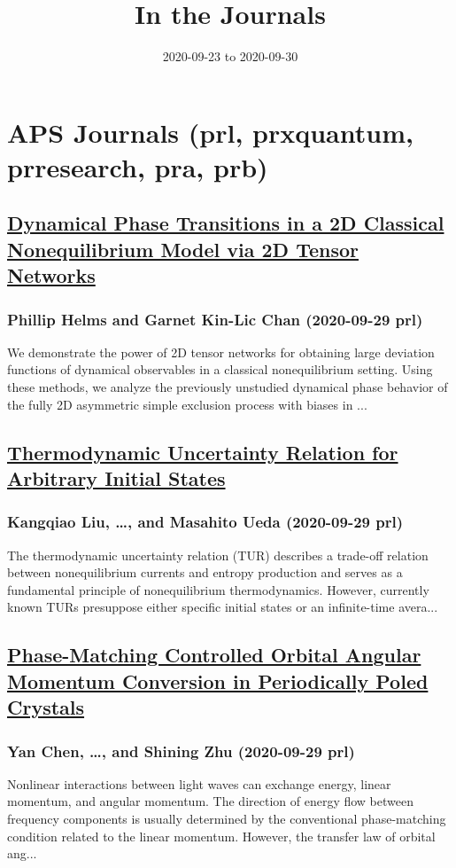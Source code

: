 \title{In the Journals}
\date{2020-09-23 to 2020-09-30}
\maketitle

\section{APS Journals (prl, prxquantum, prresearch, pra, prb)}
\subsection*{\href{http://link.aps.org/doi/10.1103/PhysRevLett.125.140601}{Dynamical Phase Transitions in a 2D Classical Nonequilibrium Model via 2D Tensor Networks}}
\subsubsection*{Phillip Helms and Garnet Kin-Lic Chan (2020-09-29 prl)}
We demonstrate the power of 2D tensor networks for obtaining large deviation functions of dynamical observables in a classical nonequilibrium setting. Using these methods, we analyze the previously unstudied dynamical phase behavior of the fully 2D asymmetric simple exclusion process with biases in ...
\subsection*{\href{http://link.aps.org/doi/10.1103/PhysRevLett.125.140602}{Thermodynamic Uncertainty Relation for Arbitrary Initial States}}
\subsubsection*{Kangqiao Liu, \dots, and Masahito Ueda (2020-09-29 prl)}
The thermodynamic uncertainty relation (TUR) describes a trade-off relation between nonequilibrium currents and entropy production and serves as a fundamental principle of nonequilibrium thermodynamics. However, currently known TURs presuppose either specific initial states or an infinite-time avera...
\subsection*{\href{http://link.aps.org/doi/10.1103/PhysRevLett.125.143901}{Phase-Matching Controlled Orbital Angular Momentum Conversion in Periodically Poled Crystals}}
\subsubsection*{Yan Chen, \dots, and Shining Zhu (2020-09-29 prl)}
Nonlinear interactions between light waves can exchange energy, linear momentum, and angular momentum. The direction of energy flow between frequency components is usually determined by the conventional phase-matching condition related to the linear momentum. However, the transfer law of orbital ang...
